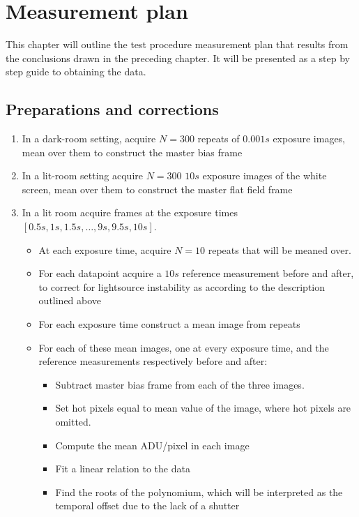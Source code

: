 \documentclass[../main.tex]{subfiles}
\begin{document}
		\section{Measurement plan}
		This chapter will outline the test procedure measurement plan that results from the conclusions drawn in the preceding chapter. It will be presented as a step by step guide to obtaining the data. 
		
		\subsection{Preparations and corrections}
		\begin{enumerate}
			\item In a dark-room setting, acquire $N=300$ repeats of $0.001s$ exposure images, mean over them to construct the master bias frame
			\item In a lit-room setting acquire $N=300$ $10s$ exposure images of the white screen, mean over them to construct the master flat field frame
			\item In a lit room acquire frames at the exposure times $[0.5s, 1s, 1.5s, \dots, 9s, 9.5s, 10s]$.
			\begin{itemize}
				\item At each exposure time, acquire $N = 10$ repeats that will be meaned over.
				\item For each datapoint acquire a $10s$ reference measurement before and after, to correct for lightsource instability as according to the description outlined above
				\item For each exposure time construct a mean image from repeats
				\item For each of these mean images, one at every exposure time, and the reference measurements respectively before and after:
				\begin{itemize}
					\item Subtract master bias frame from each of the three images.
					\item Set hot pixels equal to mean value of the image, where hot pixels are omitted.
					\item Compute the mean ADU/pixel in each image
					\item Fit a linear relation to the data
					\item Find the roots of the polynomium, which will be interpreted as the temporal offset due to the lack of a shutter
				\end{itemize}
			\end{itemize}
		\end{enumerate}
		
\end{document}
